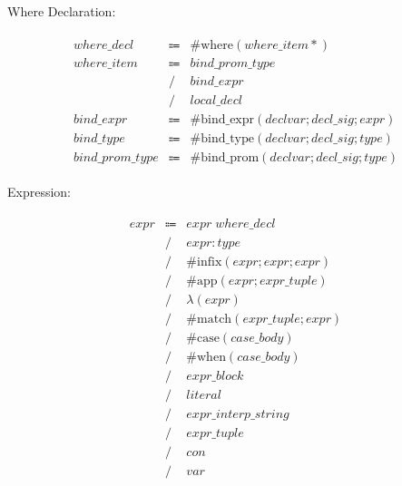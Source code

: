Where Declaration:

\begin{align*}
    \begin{array}{rcll}
        \mathit{where\_decl}
        &\Coloneq &\mathrm{\#where}(\mathit{where\_item}{*}) \\
        \mathit{where\_item}
        &\Coloneq &\mathit{bind\_prom\_type} \\
        &\mathrel{/} &\mathit{bind\_expr} \\
        &\mathrel{/} &\mathit{local\_decl} \\
        \mathit{bind\_expr}
        &\Coloneq &\mathrm{\#bind\_expr}(\mathit{declvar}; \mathit{decl\_sig}; \mathit{expr}) \\
        \mathit{bind\_type}
        &\Coloneq &\mathrm{\#bind\_type}(\mathit{declvar}; \mathit{decl\_sig}; \mathit{type}) \\
        \mathit{bind\_prom\_type}
        &\Coloneq &\mathrm{\#bind\_prom}(\mathit{declvar}; \mathit{decl\_sig}; \mathit{type})
    \end{array}
\end{align*}

Expression:

\begin{align*}
    \begin{array}{rcll}
        \mathit{expr}
        &\Coloneq &\mathit{expr}\; \mathit{where\_decl} \\
        &\mathrel{/} &\mathit{expr}: \mathit{type} \\
        &\mathrel{/} &\mathrm{\#infix}(\mathit{expr}; \mathit{expr}; \mathit{expr}) \\
        &\mathrel{/} &\mathrm{\#app}(\mathit{expr}; \mathit{expr\_tuple}) \\
        &\mathrel{/} &\lambda(\mathit{expr}) \\
        &\mathrel{/} &\mathrm{\#match}(\mathit{expr\_tuple}; \mathit{expr}) \\
        &\mathrel{/} &\mathrm{\#case}(\mathit{case\_body}) \\
        &\mathrel{/} &\mathrm{\#when}(\mathit{case\_body}) \\
        &\mathrel{/} &\mathit{expr\_block} \\
        &\mathrel{/} &\mathit{literal} \\
        &\mathrel{/} &\mathit{expr\_interp\_string} \\
        &\mathrel{/} &\mathit{expr\_tuple} \\
        &\mathrel{/} &\mathit{con} \\
        &\mathrel{/} &\mathit{var}
    \end{array}
\end{align*}

